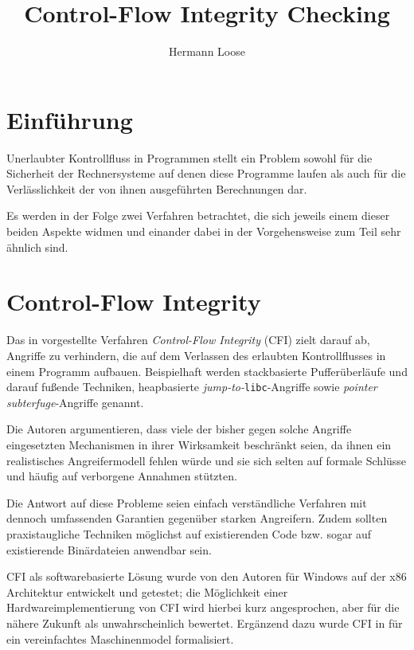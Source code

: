\documentclass[11pt]{article}
\title{Control-Flow Integrity Checking}
\author{Hermann Loose}
\begin{document}
\maketitle

\section{Einführung}

Unerlaubter Kontrollfluss in Programmen stellt ein Problem sowohl für die
Sicherheit der Rechnersysteme auf denen diese Programme laufen als auch für die
Verlässlichkeit der von ihnen ausgeführten Berechnungen dar.

Es werden in der Folge zwei Verfahren betrachtet, die sich jeweils einem dieser
beiden Aspekte widmen und einander dabei in der Vorgehensweise zum Teil sehr
ähnlich sind.

\section{Control-Flow Integrity}

Das in \cite{abadi-2005-control-msr} vorgestellte Verfahren \emph{Control-Flow
Integrity} (CFI) zielt darauf ab, Angriffe zu verhindern, die auf dem Verlassen
des erlaubten Kontrollflusses in einem Programm aufbauen. Beispielhaft werden
stackbasierte Pufferüberläufe und darauf fußende Techniken, heapbasierte
\emph{jump-to-}\texttt{libc}-Angriffe sowie \emph{pointer subterfuge}-Angriffe
genannt.

Die Autoren argumentieren, dass viele der bisher gegen solche Angriffe
eingesetzten Mechanismen in ihrer Wirksamkeit beschränkt seien, da ihnen ein
realistisches Angreifermodell fehlen würde und sie sich selten auf formale
Schlüsse und häufig auf verborgene Annahmen stützten.

Die Antwort auf diese Probleme seien einfach verständliche Verfahren mit
dennoch umfassenden Garantien gegenüber starken Angreifern. Zudem sollten
praxistaugliche Techniken möglichst auf existierenden Code bzw. sogar auf
existierende Binärdateien anwendbar sein.

CFI als softwarebasierte Lösung wurde von den Autoren für Windows auf der x86
Architektur entwickelt und getestet; die Möglichkeit einer
Hardwareimplementierung von CFI wird hierbei kurz angesprochen, aber für die
nähere Zukunft als unwahrscheinlich bewertet. Ergänzend dazu wurde CFI in
\cite{abadi-2005-theory-fmse} für ein vereinfachtes Maschinenmodel
formalisiert.
\end{document}
